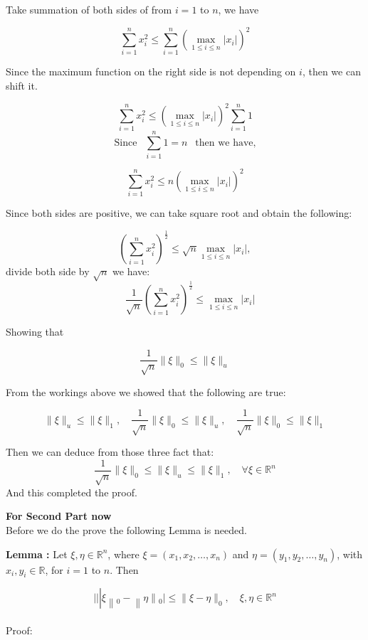 \documentclass{article}
\begin{document}
Take summation of both sides of from $i=1$ to $n$, we have

$$
\sum_{i=1}^{n} x_{i}^{2} \leq \sum_{i=1}^{n}\left(\max _{1 \leq i \leq n}\left|x_{i}\right|\right)^{2}
$$

Since the maximum function on the right side  is not depending on $i$, then we can shift it.

$$
\sum_{i=1}^{n} x_{i}^{2} \leq\left(\max _{1 \leq i \leq n}\left|x_{i}\right|\right)^{2} \sum_{i=1}^{n} 1
$$
$$\text{Since } ~~\sum_{i=1}^{n} 1 =n ~~\text{ then we have,} $$ 

$$
\sum_{i=1}^{n} x_{i}^{2} \leq n\left(\max _{1 \leq i \leq n}\left|x_{i}\right|\right)^{2}
$$

Since both sides are positive, we can take square root and obtain the following:

$$
\left(\sum_{i=1}^{n} x_{i}^{2}\right)^{\frac{1}{2}} \leq \sqrt{n} \max _{1 \leq i \leq n}\left|x_{i}\right|, $$
divide both side by $\sqrt{n}$ we have:
$$\quad \frac{1}{\sqrt{n}}\left(\sum_{i=1}^{n} x_{i}^{2}\right)^{\frac{1}{2}} \leq \max _{1 \leq i \leq n}\left|x_{i}\right|
$$

Showing that

$$
\frac{1}{\sqrt{n}}\|\xi\|_{0} \leq\|\xi\|_{u}
$$

From the workings above we showed that the following are true:

$$
\|\xi\|_{u} \leq\|\xi\|_{1}, \quad \frac{1}{\sqrt{n}}\|\xi\|_{0} \leq\|\xi\|_{u}, \quad \frac{1}{\sqrt{n}}\|\xi\|_{0} \leq\|\xi\|_{1}
$$

Then we can deduce from those three fact that:
$$\frac{1}{\sqrt{n}}\|\xi\|_{0} \leq\|\xi\|_{u} \leq\|\xi\|_{1}, \quad \forall \xi \in \mathbb{R}^{n}$$
And this completed the proof.



\textbf{For Second Part now}\\

Before we do the prove the following Lemma is needed.

\textbf{Lemma :}  Let $\xi, \eta \in \mathbb{R}^{n}$, where $\xi=\left(x_{1}, x_{2}, \ldots, x_{n}\right)$ and $\eta=\left(y_{1}, y_{2}, \ldots, y_{n}\right)$, with $x_{i}, y_{i} \in \mathbb{R}$, for $i=1$ to $n$. Then

$$
||\left|\xi\left\|_{0}-\right\| \eta\left\|_{0} \mid \leq\right\| \xi-\eta \|_{0}, \quad \xi, \eta \in \mathbb{R}^{n}\right.
$$\\
Proof:\\
\end{document}
